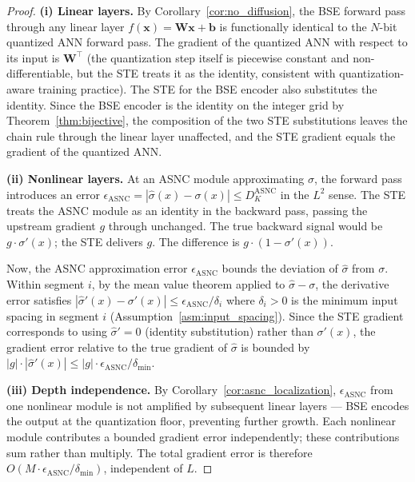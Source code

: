 \documentclass{article}
\theoremstyle{plain}
\theoremstyle{definition}
\theoremstyle{remark}
\begin{document}
\begin{proof}
\textbf{(i) Linear layers.}
By Corollary~\ref{cor:no_diffusion}, the BSE forward pass through any linear layer
$f(\mathbf{x}) = \mathbf{W}\mathbf{x} + \mathbf{b}$ is functionally identical to the
$N$-bit quantized ANN forward pass. The gradient of the quantized ANN with respect
to its input is $\mathbf{W}^\top$ (the quantization step itself is piecewise constant
and non-differentiable, but the STE treats it as the identity, consistent with
quantization-aware training practice). The STE for the BSE encoder also substitutes
the identity. Since the BSE encoder is the identity on the integer grid by
Theorem~\ref{thm:bijective}, the composition of the two STE substitutions leaves the
chain rule through the linear layer unaffected, and the STE gradient equals the
gradient of the quantized ANN.

\textbf{(ii) Nonlinear layers.}
At an ASNC module approximating $\sigma$, the forward pass introduces an error
$\epsilon_{\mathrm{ASNC}} = |\hat{\sigma}(x) - \sigma(x)| \le D_K^{\mathrm{ASNC}}$
in the $L^2$ sense. The STE treats the ASNC module as an identity in the backward
pass, passing the upstream gradient $g$ through unchanged. The true backward signal
would be $g \cdot \sigma'(x)$; the STE delivers $g$. The difference is
$g \cdot (1 - \sigma'(x))$.

Now, the ASNC approximation error $\epsilon_{\mathrm{ASNC}}$ bounds the deviation of
$\hat{\sigma}$ from $\sigma$. Within segment $i$, by the mean value theorem applied
to $\hat{\sigma} - \sigma$, the derivative error satisfies
$|\hat{\sigma}'(x) - \sigma'(x)| \le \epsilon_{\mathrm{ASNC}} / \delta_i$
where $\delta_i > 0$ is the minimum input spacing in segment $i$
(Assumption~\ref{asm:input_spacing}). Since the STE gradient corresponds to using
$\hat{\sigma}' = 0$ (identity substitution) rather than $\sigma'(x)$, the gradient
error relative to the true gradient of $\hat{\sigma}$ is bounded by
$|g| \cdot |\hat{\sigma}'(x)| \le |g| \cdot \epsilon_{\mathrm{ASNC}} / \delta_{\min}$.

\textbf{(iii) Depth independence.}
By Corollary~\ref{cor:asnc_localization}, $\epsilon_{\mathrm{ASNC}}$ from one
nonlinear module is not amplified by subsequent linear layers — BSE encodes the
output at the quantization floor, preventing further growth. Each nonlinear module
contributes a bounded gradient error independently; these contributions sum rather
than multiply. The total gradient error is therefore
$O(M \cdot \epsilon_{\mathrm{ASNC}} / \delta_{\min})$, independent of $L$.
\end{proof}
\end{document}
